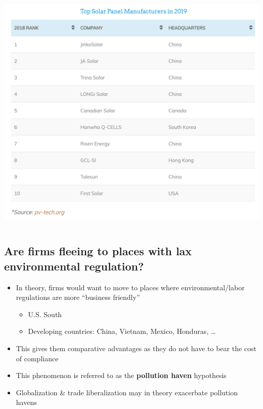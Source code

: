 \documentclass[
]{article}
\providecommand{\tightlist}{%
  \setlength{\itemsep}{0pt}\setlength{\parskip}{0pt}}
\begin{document}
\hypertarget{section-3}{%
\subsection{}\label{section-3}}

\includegraphics[width=\textwidth,height=4.6875in]{figures/m7_solar_manufacturer.png}

\hypertarget{are-firms-fleeing-to-places-with-lax-environmental-regulation}{%
\subsection{Are firms fleeing to places with lax environmental
regulation?}\label{are-firms-fleeing-to-places-with-lax-environmental-regulation}}

\begin{itemize}
\tightlist
\item
  In theory, firms would want to move to places where
  environmental/labor regulations are more ``business friendly''

  \begin{itemize}
  \tightlist
  \item
    U.S. South
  \item
    Developing countries: China, Vietnam, Mexico, Honduras, \ldots{}
  \end{itemize}
\item
  This gives them comparative advantages as they do not have to bear the
  cost of compliance
\item
  This phenomenon is referred to as the \textbf{pollution haven}
  hypothesis
\item
  Globalization \& trade liberalization may in theory exacerbate
  pollution havens
\end{itemize}
\end{document}
